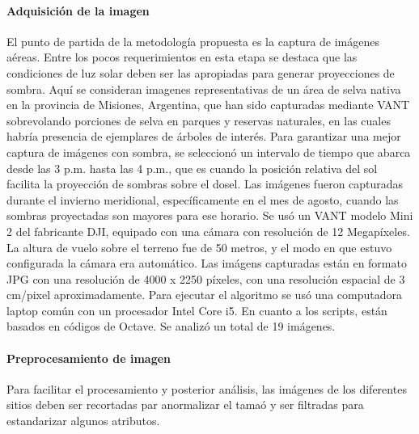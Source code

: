 \paragraph{Adquisición de la imagen}
El punto de partida de la metodología propuesta es la captura de imágenes aéreas. Entre los pocos requerimientos en esta etapa se destaca que las condiciones de luz solar deben ser las apropiadas para generar proyecciones de sombra. Aquí se consideran imagenes representativas de un área de selva nativa en la provincia de Misiones, Argentina, que han sido capturadas mediante VANT sobrevolando porciones de selva en parques y reservas naturales, en las cuales habría presencia de ejemplares de árboles de interés. Para garantizar una mejor captura de imágenes con sombra, se seleccionó un intervalo de tiempo que abarca desde las 3 p.m. hasta las 4 p.m., que es cuando la posición relativa del sol facilita la proyección de sombras sobre el dosel. Las imágenes fueron capturadas durante el invierno meridional, específicamente en el mes de agosto, cuando las sombras proyectadas son mayores para ese horario. Se usó un VANT modelo Mini 2 del fabricante DJI, equipado con una cámara con resolución de 12 Megapíxeles. La altura de vuelo sobre el terreno fue de 50 metros, y el modo en que estuvo configurada la cámara era automático. Las imágens capturadas están en formato JPG con una resolución de 4000 x 2250 píxeles, con una resolución espacial de 3 cm/pixel aproximadamente. Para ejecutar el algoritmo se usó una computadora laptop común con un procesador Intel Core i5. En cuanto a los scripts, están basados en códigos de Octave. Se analizó un total de 19 imágenes.

\paragraph{Preprocesamiento de imagen} \label{Metodología}
Para facilitar el procesamiento y posterior análisis, las imágenes de los diferentes sitios deben ser recortadas par anormalizar el tamaó y ser filtradas para estandarizar algunos atributos.
